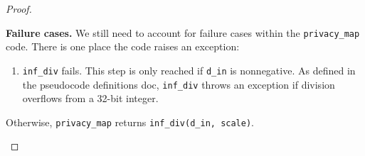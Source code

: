 \documentclass[11pt,a4paper]{article}
\newcommand{\hanwen}[1]{{ {\color{purple}{(hanwen)~#1}}}}
\newcommand{\function}{\texttt{function}}
\begin{document}
\begin{proof}
\begin{enumerate}

 
 \textbf{Failure cases.} We still need to account for failure cases within the \texttt{privacy\_map} code. There is one place the code raises an exception:
 
 \begin{enumerate}
     \item \texttt{inf\_div} fails. This step is only reached if \texttt{d\_in} is nonnegative. As defined in the pseudocode definitions doc, \texttt{inf\_div} throws an exception if division overflows from a 32-bit integer. 
 \end{enumerate}
 
Otherwise, \texttt{privacy\_map} returns \texttt{inf\_div(d\_in, scale)}.
\end{enumerate}
\end{proof}



\end{document}
